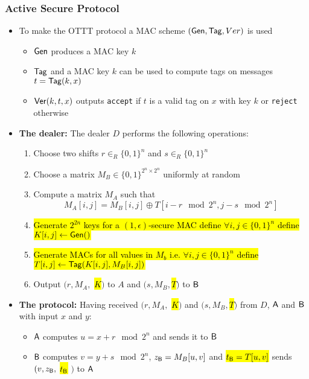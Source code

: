 \subsubsection{Active Secure Protocol}
\begin{itemize}
    \item To make the OTTT protocol a MAC scheme $(\mathsf{Gen}, \mathsf{Tag}, Ver)$ is used 
    \begin{itemize}
        \item $\mathsf{Gen}$ produces a MAC key $k$ 
        \item $\mathsf{Tag}$ and a MAC key $k$ can be used to compute tags on messages $t = \mathsf{Tag}(k,x)$
        \item $\mathsf{Ver}(k, t, x)$ outputs \texttt{accept} if $t$ is a valid tag on $x$ with key $k$ or \texttt{reject} otherwise
    \end{itemize}
    \item \textbf{The dealer:} The dealer $D$ performs the following operations:
    \begin{enumerate}
        \item Choose two shifts $r \in_R \{0,1\}^n$ and $s \in_R \{0,1\}^n$
        \item Choose a matrix $M_B \in \{0,1\}^{2^n \times 2^n}$ uniformly at random
        \item Compute a matrix $M_A$ such that
        \begin{equation*}
            M_A [i,j] = M_B [i,j] \oplus T[i-r \mod 2^n, j-s \mod 2^n]
        \end{equation*}
    \item \hl{Generate $2^{2n}$ keys for a $(1, \epsilon)$-secure MAC define $\forall i,j \in \{0,1\}^n$ define $K[i,j] \leftarrow \mathsf{Gen}()$}
    \item \hl{Generate MACs for all values in $M_b$ i.e. $\forall i,j \in \{0,1\}^n$ define $T[i,j] \leftarrow \mathsf{Tag}(K[i,j], M_B[i,j])$}
    \item Output $(r, M_A, $ \hl{$K$}$)$ to $A$ and $(s, M_B,$\hl{$T$}$)$ to $\mathsf{B}$
    \end{enumerate}
    \item \textbf{The protocol:} Having received $(r, M_A, $ \hl{$K$}$)$ and $(s, M_B,$\hl{$T$}$)$ from $D$, $\mathsf{A}$ and $\mathsf{B}$ with input $x$ and $y$:
    \begin{itemize}
        \item $\mathsf{A}$ computes $u = x+r \mod 2^n$ and sends it to $\mathsf{B}$
        \item $\mathsf{B}$ computes $v = y+s \mod 2^n$, $z_{\mathsf{B}} = M_B[u,v]$ and \hl{$t_{\mathsf{B}} = T[u,v]$} sends $(v, z_{\mathsf{B}},$ \hl{$t_{\mathsf{B}}$} $)$ to $\mathsf{A}$

\end{itemize}
\end{itemize}
